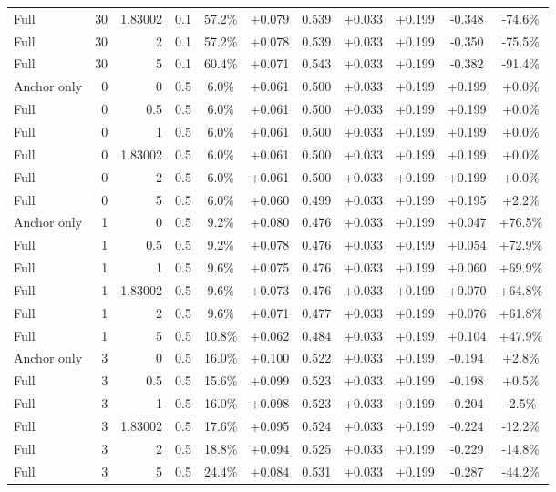 \begin{table}[htbp]
\begin{tabular}{lrrrccccccc}
Full & 30 & 1.83002 & 0.1 & 57.2\% & +0.079 & 0.539 & +0.033 & +0.199 & -0.348 & -74.6\% \\
Full & 30 & 2 & 0.1 & 57.2\% & +0.078 & 0.539 & +0.033 & +0.199 & -0.350 & -75.5\% \\
Full & 30 & 5 & 0.1 & 60.4\% & +0.071 & 0.543 & +0.033 & +0.199 & -0.382 & -91.4\% \\
Anchor only & 0 & 0 & 0.5 & 6.0\% & +0.061 & 0.500 & +0.033 & +0.199 & +0.199 & +0.0\% \\
Full & 0 & 0.5 & 0.5 & 6.0\% & +0.061 & 0.500 & +0.033 & +0.199 & +0.199 & +0.0\% \\
Full & 0 & 1 & 0.5 & 6.0\% & +0.061 & 0.500 & +0.033 & +0.199 & +0.199 & +0.0\% \\
Full & 0 & 1.83002 & 0.5 & 6.0\% & +0.061 & 0.500 & +0.033 & +0.199 & +0.199 & +0.0\% \\
Full & 0 & 2 & 0.5 & 6.0\% & +0.061 & 0.500 & +0.033 & +0.199 & +0.199 & +0.0\% \\
Full & 0 & 5 & 0.5 & 6.0\% & +0.060 & 0.499 & +0.033 & +0.199 & +0.195 & +2.2\% \\
Anchor only & 1 & 0 & 0.5 & 9.2\% & +0.080 & 0.476 & +0.033 & +0.199 & +0.047 & +76.5\% \\
Full & 1 & 0.5 & 0.5 & 9.2\% & +0.078 & 0.476 & +0.033 & +0.199 & +0.054 & +72.9\% \\
Full & 1 & 1 & 0.5 & 9.6\% & +0.075 & 0.476 & +0.033 & +0.199 & +0.060 & +69.9\% \\
Full & 1 & 1.83002 & 0.5 & 9.6\% & +0.073 & 0.476 & +0.033 & +0.199 & +0.070 & +64.8\% \\
Full & 1 & 2 & 0.5 & 9.6\% & +0.071 & 0.477 & +0.033 & +0.199 & +0.076 & +61.8\% \\
Full & 1 & 5 & 0.5 & 10.8\% & +0.062 & 0.484 & +0.033 & +0.199 & +0.104 & +47.9\% \\
Anchor only & 3 & 0 & 0.5 & 16.0\% & +0.100 & 0.522 & +0.033 & +0.199 & -0.194 & +2.8\% \\
Full & 3 & 0.5 & 0.5 & 15.6\% & +0.099 & 0.523 & +0.033 & +0.199 & -0.198 & +0.5\% \\
Full & 3 & 1 & 0.5 & 16.0\% & +0.098 & 0.523 & +0.033 & +0.199 & -0.204 & -2.5\% \\
Full & 3 & 1.83002 & 0.5 & 17.6\% & +0.095 & 0.524 & +0.033 & +0.199 & -0.224 & -12.2\% \\
Full & 3 & 2 & 0.5 & 18.8\% & +0.094 & 0.525 & +0.033 & +0.199 & -0.229 & -14.8\% \\
Full & 3 & 5 & 0.5 & 24.4\% & +0.084 & 0.531 & +0.033 & +0.199 & -0.287 & -44.2\% \\

\end{tabular}
\end{table}
